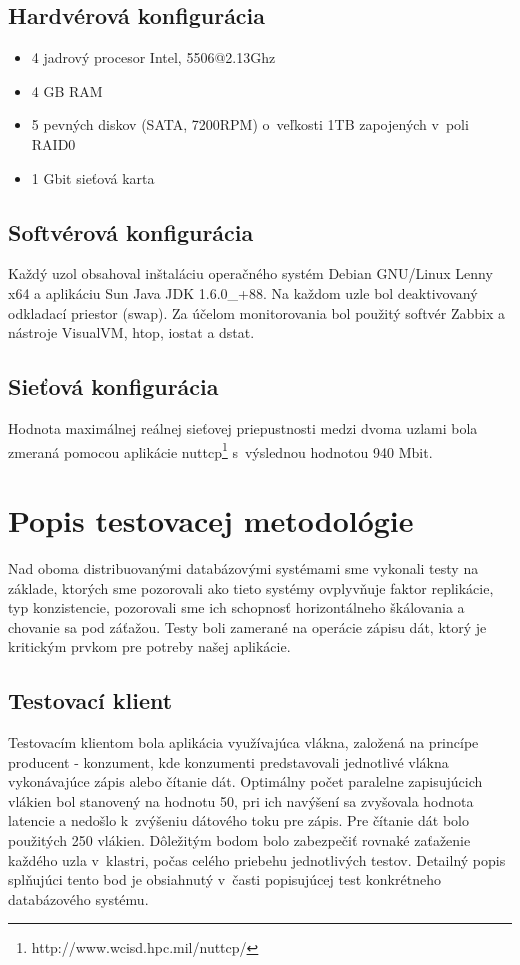 \documentclass[11pt,twoside,a4paper]{book}
\begin{document}
\subsection*{Hardvérová konfigurácia}
\begin{itemize}
 \item 4 jadrový procesor Intel, 5506@2.13Ghz
 \item 4 GB RAM
 \item 5 pevných diskov (SATA, 7200RPM) o~veľkosti 1TB zapojených v~poli RAID0
 \item 1 Gbit sieťová karta
\end{itemize}

\subsection*{Softvérová konfigurácia} 
Každý uzol obsahoval inštaláciu operačného systém Debian GNU/Linux Lenny x64 a aplikáciu Sun Java JDK 1.6.0\_+88. Na každom uzle bol deaktivovaný odkladací priestor (swap). Za účelom monitorovania bol použitý softvér Zabbix a nástroje VisualVM, htop, iostat a dstat.

\subsection*{Sieťová konfigurácia}

Hodnota maximálnej reálnej sieťovej priepustnosti medzi dvoma uzlami bola zmeraná pomocou aplikácie nuttcp\footnote{http://www.wcisd.hpc.mil/nuttcp/} s~výslednou hodnotou 940 Mbit.

\section{Popis testovacej metodológie}

Nad oboma distribuovanými databázovými systémami sme vykonali testy na základe, ktorých sme pozorovali ako tieto systémy ovplyvňuje faktor replikácie, typ konzistencie, pozorovali sme ich schopnosť horizontálneho škálovania a chovanie sa pod záťažou. Testy boli zamerané na operácie zápisu dát, ktorý je kritickým prvkom pre potreby našej aplikácie.

\subsection{Testovací klient}

Testovacím klientom bola aplikácia využívajúca vlákna, založená na princípe producent - konzument, kde konzumenti predstavovali jednotlivé vlákna vykonávajúce zápis alebo čítanie dát. Optimálny počet paralelne zapisujúcich vlákien bol stanovený na hodnotu 50, pri ich navýšení sa zvyšovala hodnota latencie a nedošlo k~zvýšeniu dátového toku pre zápis. Pre čítanie dát bolo použitých 250 vlákien. Dôležitým bodom bolo zabezpečiť rovnaké zaťaženie každého uzla v~klastri, počas celého priebehu jednotlivých testov. Detailný popis splňujúci tento bod je obsiahnutý v~časti popisujúcej test konkrétneho databázového systému.
\end{document}
